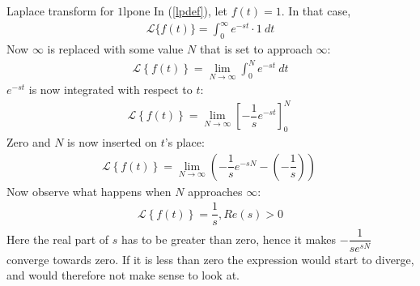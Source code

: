 \begin{example}{Laplace transform for $1$}{lpone}
In (\ref{lpdef}), let $f(t)=1$. In that case,
\begin{align*}
\mathcal{L}\{f(t)\}=\int_{0}^{\infty} e^{-st} \cdot 1\ dt
\end{align*}
Now $\infty$ is replaced with some value $N$ that is set to approach $\infty$:
\begin{align*}
\mathcal{L} \left\{f(t) \right\}= \lim_{N \to \infty}  \int_{0}^{N} e^{-st}\ dt
\end{align*}
$e^{-st}$ is now integrated with respect to $t$:
\begin{align*}
\mathcal{L} \left\{f(t) \right\}= \lim_{N \to \infty} \left[ -\dfrac{1}{s} e^{-st} \right]_{0}^{N} \ 
\end{align*}
Zero and $N$ is now inserted on $t$’s place:
\begin{align*}
\mathcal{L} \left\{f(t) \right\}= \lim_{N \to \infty} \left( -\dfrac{1}{s} e^{-sN} - \left(-\dfrac{1}{s}\right) \right) \ 
\end{align*}
Now observe what happens when $N$ approaches $\infty$:
\begin{align*}
\mathcal{L} \left\{f(t) \right\}=\dfrac{1}{s} , Re(s) > 0
\end{align*}
Here the real part of $s$ has to be greater than zero, hence it makes $-\dfrac{1}{se^{sN}}$ converge towards zero. If it is less than zero the expression would start to diverge, and would therefore not make sense to look at.
\end{example}

